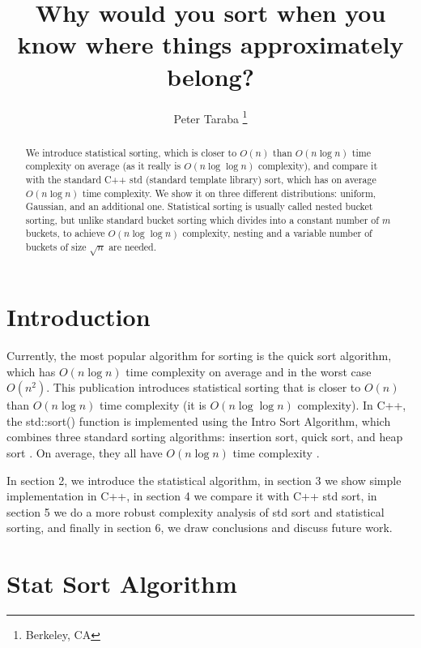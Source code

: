 \documentclass[12pt]{article}
\title{Why would you sort when you know where things approximately belong?}
\author{Peter Taraba \footnote{Berkeley, CA}}
\begin{document}
	
	\maketitle
	
	\begin{abstract}
  		We introduce statistical sorting, which is closer to $O(n)$ than $O(n \log n)$ time complexity on average (as it really is $O(n \log \log n)$ complexity), and compare it with the standard C++ std (standard template library) sort, which has on average $O(n \log n)$ time complexity. We show it on three different distributions: uniform, Gaussian, and an additional one. Statistical sorting is usually called nested bucket sorting, but unlike standard bucket sorting which divides into a constant number of $m$ buckets, to achieve $O(n \log \log n)$ complexity, nesting and a variable number of buckets of size $\sqrt{n}$ are needed.
	\end{abstract}
	
	\section{Introduction}
	
		Currently, the most popular algorithm for sorting is the quick sort algorithm, which has $O(n \log n)$ time complexity on average \cite{numrec} and in the worst case $O(n^2)$. This publication introduces statistical sorting that is closer to $O(n)$ than $O(n \log n)$ time complexity (it is $O(n \log \log n)$ complexity). In C++, the std::sort() function is implemented using the Intro Sort Algorithm, which combines three standard sorting algorithms: insertion sort, quick sort, and heap sort \cite{cppsort}. On average, they all have $O(n \log n)$ time complexity \cite{wikisort}.
		
		In section 2, we introduce the statistical algorithm, in section 3 we show simple implementation in C++, in section 4 we compare it with C++ std sort, in section 5 we do a more robust complexity analysis of std sort and statistical sorting, and finally in section 6, we draw conclusions and discuss future work.

	\section{Stat Sort Algorithm}
	
\end{document}
